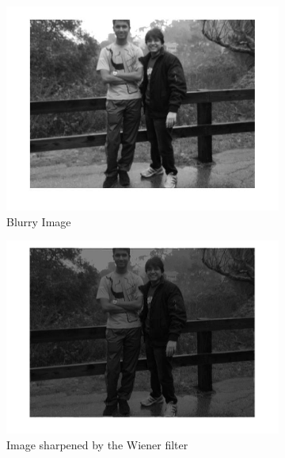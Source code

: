 \begin{figure}
        \centering
        \begin{subfigure}[b]{0.4\textwidth}
                \centering
                \includegraphics[width=\textwidth]{blur_personal.jpg}
                \caption{Blurry Image}
               
        \end{subfigure}
        \begin{subfigure}[b]{0.4\textwidth}
                 \centering
                 \includegraphics[width=\textwidth]{sharp_personal_bright.jpg}
                 \caption{Image sharpened by the Wiener filter }
                       
        \end{subfigure}
              
        \caption{} \label{fig:true_metrics}
\end{figure}




















